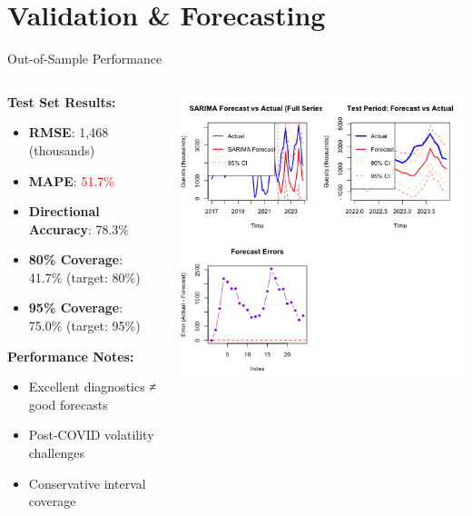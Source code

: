 \documentclass[10pt]{beamer}
\begin{document}
\section{Validation \& Forecasting}

\begin{frame}{Out-of-Sample Performance}
\begin{columns}
\begin{column}{0.45\textwidth}
\textbf{Test Set Results:}
\begin{itemize}
\item \textbf{RMSE}: 1,468 (thousands)
\item \textbf{MAPE}: \textcolor{red}{51.7\%}
\item \textbf{Directional Accuracy}: 78.3\%
\item \textbf{80\% Coverage}: 41.7\% (target: 80\%)
\item \textbf{95\% Coverage}: 75.0\% (target: 95\%)
\end{itemize}

\vspace{0.3cm}
\textbf{Performance Notes:}
\begin{itemize}
\item Excellent diagnostics ≠ good forecasts
\item Post-COVID volatility challenges
\item Conservative interval coverage
\end{itemize}
\end{column}

\begin{column}{0.55\textwidth}
\includegraphics[width=\textwidth,height=0.85\textheight,keepaspectratio]{plots/forecast-vs-actual.png}
\end{column}
\end{columns}
\end{frame}
\end{document}
